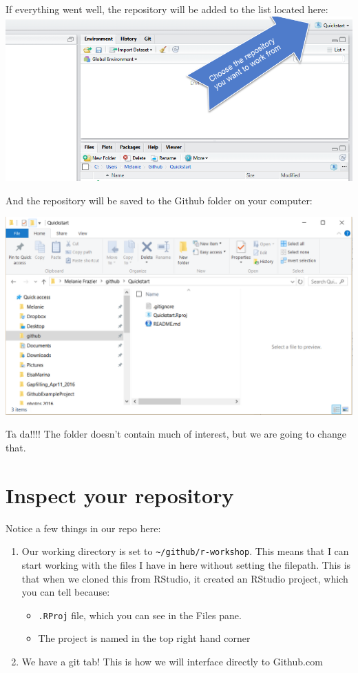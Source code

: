 \documentclass[]{book}
\providecommand{\tightlist}{%
  \setlength{\itemsep}{0pt}\setlength{\parskip}{0pt}}
\begin{document}
If everything went well, the repository will be added to the list located here:
\includegraphics{img/select_project.png}

And the repository will be saved to the Github folder on your computer:

\includegraphics{img/cloned_repository.png}

Ta da!!!! The folder doesn't contain much of interest, but we are going to change that.

\hypertarget{inspect-your-repository}{%
\section{Inspect your repository}\label{inspect-your-repository}}

Notice a few things in our repo here:

\begin{enumerate}
\def\labelenumi{\arabic{enumi}.}
\tightlist
\item
  Our working directory is set to \texttt{\textasciitilde{}/github/r-workshop}. This means that I can start working with the files I have in here without setting the filepath. This is that when we cloned this from RStudio, it created an RStudio project, which you can tell because:

  \begin{itemize}
  \tightlist
  \item
    \texttt{.RProj} file, which you can see in the Files pane.
  \item
    The project is named in the top right hand corner
  \end{itemize}
\item
  We have a git tab! This is how we will interface directly to Github.com
\end{enumerate}
\end{document}
